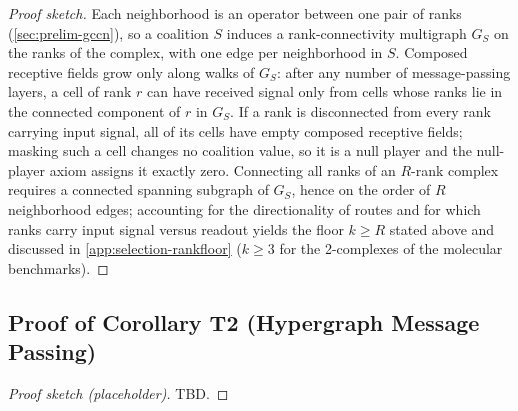 \begin{proof}[Proof sketch]
Each neighborhood is an operator between one pair of ranks
(\cref{sec:prelim-gccn}), so a coalition $S$ induces a
rank-connectivity multigraph $G_S$ on the ranks of the complex, with
one edge per neighborhood in $S$. Composed receptive fields grow only
along walks of $G_S$: after any number of message-passing layers, a
cell of rank $r$ can have received signal only from cells whose ranks
lie in the connected component of $r$ in $G_S$. If a rank is
disconnected from every rank carrying input signal, all of its cells
have empty composed receptive fields; masking such a cell changes no
coalition value, so it is a null player and the null-player axiom
assigns it exactly zero. Connecting all ranks of an $R$-rank complex
requires a connected spanning subgraph of $G_S$, hence on the order of
$R$ neighborhood edges; accounting for the directionality of routes
and for which ranks carry input signal versus readout yields the floor
$k \ge R$ stated above and discussed in \cref{app:selection-rankfloor}
($k \ge 3$ for the 2-complexes of the molecular benchmarks).
\end{proof}

\subsection{Proof of Corollary T2 (Hypergraph Message Passing)}
\label{app:proof-t2}


\begin{proof}[Proof sketch (placeholder)]
TBD. %
\end{proof}
